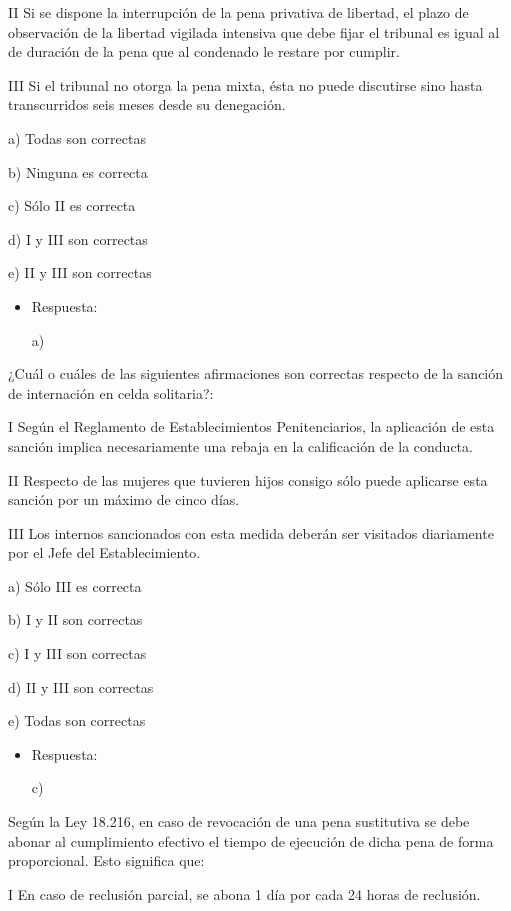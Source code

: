 \documentclass[letterpaper, 11pt]{article}
\begin{document}
II Si se dispone la interrupción de la pena privativa de libertad, el
plazo de observación de la libertad vigilada intensiva que debe fijar
el tribunal es igual al de duración de la pena que al condenado le
restare por cumplir.

III Si el tribunal no otorga la pena mixta, ésta no puede discutirse
sino hasta transcurridos seis meses desde su denegación.

a) Todas son correctas

b) Ninguna es correcta

c) Sólo II es correcta

d) I y III son correctas

e) II y III son correctas

\begin{itemize}
\item Respuesta:

a)
\end{itemize}


¿Cuál o cuáles de las siguientes afirmaciones son correctas respecto
de la sanción de internación en celda solitaria?:


I Según el Reglamento de Establecimientos Penitenciarios, la
aplicación de esta sanción implica necesariamente una rebaja en la
calificación de la conducta.

II Respecto de las mujeres que tuvieren hijos consigo sólo puede
aplicarse esta sanción por un máximo de cinco días.

III Los internos sancionados con esta medida deberán ser visitados
diariamente por el Jefe del Establecimiento.

a) Sólo III es correcta

b) I y II son correctas

c) I y III son correctas

d) II y III son correctas

e) Todas son correctas

\begin{itemize}
\item Respuesta:

c)
\end{itemize}


Según la Ley 18.216, en caso de revocación de una pena sustitutiva se
debe abonar al cumplimiento efectivo el tiempo de ejecución de dicha
pena de forma proporcional. Esto significa que:


I En caso de reclusión parcial, se abona 1 día por cada 24 horas de
reclusión.
\end{document}
